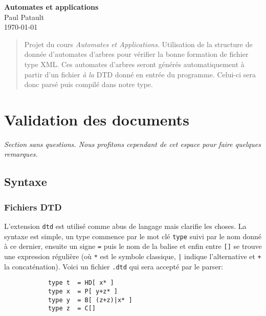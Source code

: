 \documentclass[twoside,12pt]{article}
\begin{document}

\thispagestyle{empty}

\vspace*{1.3cm}
\begin{center}
    \textbf{\LARGE Automates et applications} \\
    \bigskip\bigskip
    {\large Paul Patault} \\ %
    \bigskip
    \today
    \bigskip
\end{center}

\begin{abstract}
    Projet du cours \textit{Automates et Applications}. Utilisation de la structure
    de donnée d'automates d'arbres pour vérifier la bonne formation de fichier type
    XML. Ces automates d'arbres seront générés automatiquement à partir d'un fichier
    \textit{à la} DTD donné en entrée du programme. Celui-ci sera donc parsé puis
    compilé dans notre type.
\end{abstract}


\section{Validation des documents}
\textit{Section sans questions. Nous profitons cependant de cet espace pour faire quelques
remarques.}

\subsection{Syntaxe}

\subsubsection{Fichiers DTD}

L'extension \texttt{dtd} est utilisé comme abus de langage mais clarifie les choses.
La syntaxe est simple, un type commence par le mot clé \og\texttt{type}\fg{} suivi
par le nom donné à ce dernier, ensuite un signe \og\texttt{=}\fg{} puis le nom de
la balise et enfin entre \og\texttt{[]}\fg{} se trouve une expression régulière
(où \og\texttt{*}\fg{} est le symbole classique, \og\texttt{|}\fg{} indique
l'alternative et \og\texttt{+}\fg{} la concaténation).
Voici un fichier \texttt{.dtd} qui sera accepté par le parser:
  \begin{verbatim}
            type t  = HD[ x* ]
            type x  = P[ y+z* ]
            type y  = B[ (z+z)|x* ]
            type z  = C[]
  \end{verbatim}
\end{document}
